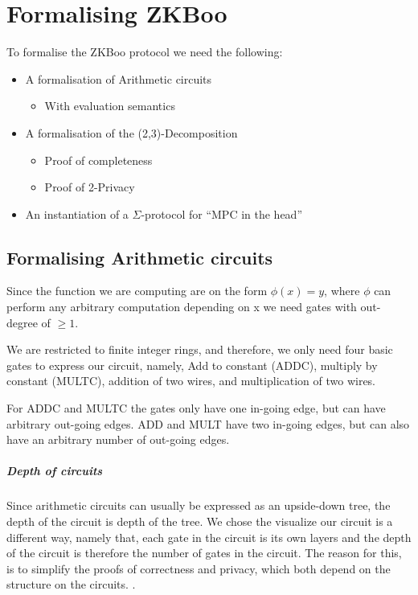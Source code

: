 \chapter{Formalising ZKBoo}
\label{ch:formal_zkboo}

To formalise the ZKBoo protocol we need the following:

\begin{itemize}
  \item A formalisation of Arithmetic circuits
    \begin{itemize}
        \item With evaluation semantics
    \end{itemize}
  \item A formalisation of the (2,3)-Decomposition
    \begin{itemize}
      \item Proof of completeness
      \item Proof of 2-Privacy
    \end{itemize}
  \item An instantiation of a $\Sigma$-protocol for ``MPC in the head''
\end{itemize}

\section{Formalising Arithmetic circuits}
\label{sec:arith_circuits}
Since the function we are computing are on the form $\phi(x) = y$, where $\phi$
can perform any arbitrary computation depending on x we need gates with
out-degree of $\geq 1$.

We are restricted to finite integer rings, and therefore, we only need four
basic gates to express our circuit, namely, Add to constant (ADDC),
multiply by constant (MULTC), addition of two wires, and multiplication
of two wires.

For ADDC and MULTC the gates only have one in-going edge, but
can have arbitrary out-going edges. ADD and MULT have two in-going edges, but
can also have an arbitrary number of out-going edges.

\paragraph{Depth of circuits}
Since arithmetic circuits can usually be expressed as an upside-down tree, the
depth of the circuit is depth of the tree.
We chose the visualize our circuit is a different way, namely that, each gate in
the circuit is its own layers and the depth of the circuit is therefore the
number of gates in the circuit. The reason for this, is to simplify the proofs
of correctness and privacy, which both depend on the structure on the circuits.
.

